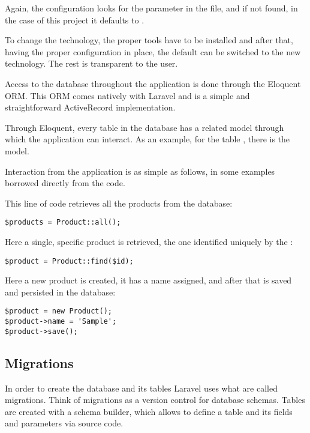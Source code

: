 Again, the configuration looks for the  parameter in the  file, and if not found, in the case of this project it defaults to .

To change the technology, the proper tools have to be installed and after that, having the proper configuration in place, the default can be switched to the new technology. The rest is transparent to the user.

Access to the database throughout the application is done through the Eloquent ORM. This ORM comes natively with Laravel and is a simple and straightforward ActiveRecord implementation.

Through Eloquent, every table in the database has a related model through which the application can interact. As an example, for the table , there is the  model.

Interaction from the application is as simple as follows, in some examples borrowed directly from the code. 

This line of code retrieves all the products from the database:

\begin{verbatim}
$products = Product::all();
\end{verbatim}

Here a single, specific product is retrieved, the one identified uniquely by the :

\begin{verbatim}
$product = Product::find($id);
\end{verbatim}

Here a new product is created, it has a name assigned, and after that is saved and persisted in the database:

\begin{verbatim}
$product = new Product();
$product->name = 'Sample';
$product->save();
\end{verbatim}

\subsection{Migrations}
In order to create the database and its tables Laravel uses what are called migrations. Think of migrations as a version control for database schemas. Tables are created with a schema builder, which allows to define a table and its fields and parameters via source code.

